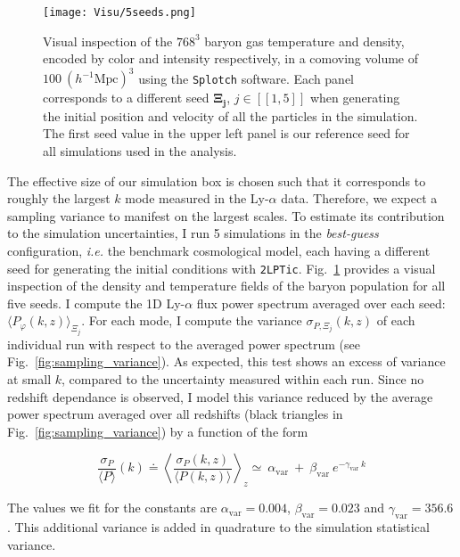 \begin{figure}
\begin{center}
\texttt{[image: Visu/5seeds.png]}
\caption{Visual inspection of the $768^3$ baryon gas temperature and density, encoded by color and intensity respectively, in a comoving volume of $100~(h^{-1}\mathrm{Mpc})^3$ using the \texttt{Splotch} software. Each panel corresponds to a different seed $\pmb{\Xi_j}$, $j \in [\![ 1, 5 ]\!]$ when generating the initial position and velocity of all the particles in the simulation. The first seed value in the upper left panel is our reference seed for all simulations used in the analysis.}
\label{fig:visu_seed}
\end{center}
\end{figure}

The effective size of our simulation box is chosen such that it corresponds to roughly the largest $k$ mode measured in the Ly-$\alpha$ data. Therefore, we expect a sampling variance to manifest on the largest scales. To estimate its contribution to the simulation uncertainties, I run 5 simulations in the \emph{best-guess} configuration, \textit{i.e.} the benchmark cosmological model, each having a different seed for generating the initial conditions with \texttt{2LPTic}. Fig.~\ref{fig:visu_seed} provides a visual inspection of the density and temperature fields of the baryon population for all five seeds. I compute the 1D Ly-$\alpha$ flux power spectrum averaged over each seed: $\langle P_\varphi (k, z) \rangle_{\Xi_j}$. For each mode, I compute the variance $\sigma_{P, \Xi_j} (k, z)$ of each individual run with respect to the averaged power spectrum (see Fig.~\ref{fig:sampling_variance}). As expected, this test shows an excess of variance at small $k$, compared to the uncertainty measured within each run. Since no redshift dependance is observed, I model this variance reduced by the average power spectrum averaged over all redshifts (black triangles in Fig.~\ref{fig:sampling_variance}) by a function of the form 

\begin{equation}
\label{eq:variance_fit}
\frac{\sigma_P}{\langle P \rangle} (k) \doteq \left\langle \frac{\sigma_P (k, z)}{\langle P (k, z) \rangle} \right\rangle_{z} \simeq ~\alpha_{\mathrm{var}}~ +~ \beta_{\mathrm{var}}~e^{-\gamma_{\mathrm{var}}~k}
\end{equation}

The values we fit for the constants are $\alpha_{\mathrm{var}}=0.004$, $\beta_{\mathrm{var}}=0.023$ and $\gamma_{\mathrm{var}}=356.6$. This additional variance is added in quadrature to the simulation statistical variance.


